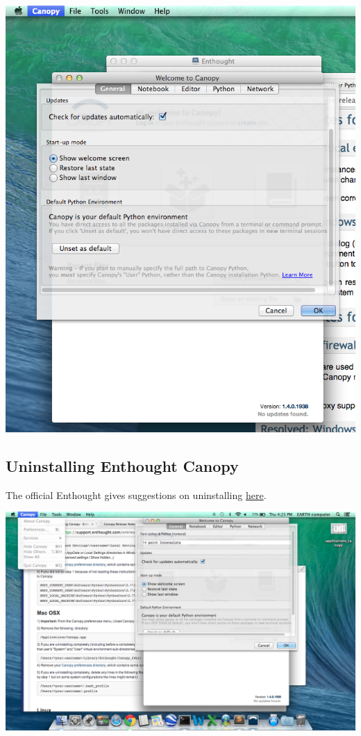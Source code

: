 \documentclass[letterpaper,10pt,english]{sphinxmanual}
\begin{document}
\includegraphics{enthought_as_default.png}


\subsection{Uninstalling Enthought Canopy}
\label{docfiles/install_dependencies:uninstalling-enthought-canopy}
The official Enthought gives suggestions on uninstalling \href{https://guide.macports.org/chunked/installing.macports.uninstalling.html}{here}.

\includegraphics{canopy_preferences.png}
\end{document}
